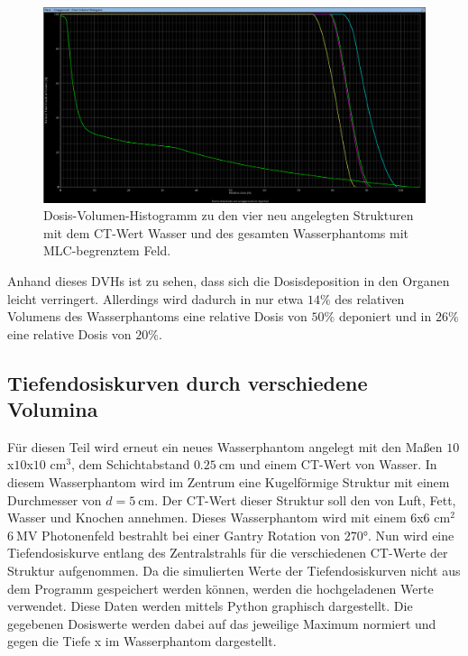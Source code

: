 \begin{figure}[H]
  \centering
  \includegraphics[width=\textwidth]{../../Wasserphantom Bilder/Aufgabe3.1_10.png}
  \caption{Dosis-Volumen-Histogramm zu den vier neu angelegten Strukturen mit dem CT-Wert Wasser und des gesamten Wasserphantoms mit MLC-begrenztem Feld.}
  \label{abb:3.1_10}
\end{figure}

Anhand dieses DVHs ist zu sehen, dass sich die Dosisdeposition in den
Organen leicht verringert. Allerdings wird dadurch in nur etwa $14\%$ des
relativen Volumens des Wasserphantoms eine relative Dosis von $50\%$ deponiert
und in $26\%$ eine relative Dosis von $20\%$.

\subsection{Tiefendosiskurven durch verschiedene Volumina}

Für diesen Teil wird erneut ein neues Wasserphantom angelegt mit den Maßen
$10$x$10$x$10$ $\si{\centi\meter\tothe{3}}$, dem Schichtabstand
$\SI{0.25}{\centi\meter}$ und einem CT-Wert von Wasser. In diesem
Wasserphantom wird im Zentrum eine Kugelförmige Struktur mit einem
Durchmesser von $d = \SI{5}{\centi\meter}$. Der CT-Wert dieser
Struktur soll den von Luft, Fett, Wasser und Knochen annehmen.
Dieses Wasserphantom wird mit einem $6$x$6$ $\si{\centi\meter\squared}$
$\SI{6}{\mega\volt}$ Photonenfeld bestrahlt bei einer Gantry Rotation von
$270°$. Nun wird eine Tiefendosiskurve entlang des Zentralstrahls
für die verschiedenen CT-Werte der Struktur aufgenommen. Da die simulierten
Werte der Tiefendosiskurven nicht aus dem Programm gespeichert werden können,
werden die hochgeladenen Werte verwendet. Diese Daten werden mittels Python
graphisch dargestellt. Die gegebenen Dosiswerte werden dabei auf das jeweilige Maximum normiert und gegen die
Tiefe x im Wasserphantom dargestellt.

